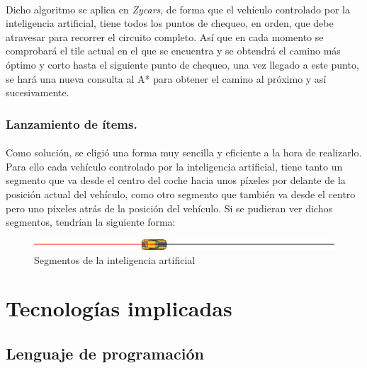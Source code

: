 \documentclass[a4paper,11pt]{article} %
\begin{document}
\paragraph{}
Dicho algoritmo se aplica en \emph{Zycars}, de forma que el vehículo controlado por la inteligencia artificial, tiene todos los
puntos de chequeo, en orden, que debe atravesar para recorrer el circuito completo. Así que en cada momento se comprobará
el tile actual en el que se encuentra y se obtendrá el camino más óptimo y corto hasta el siguiente punto de chequeo, una vez
llegado a este punto, se hará una nueva consulta al A* para obtener el camino al próximo y así sucesivamente.

\subsubsection{Lanzamiento de ítems.}

\paragraph{}
Como solución, se eligió una forma muy sencilla y eficiente a la hora de realizarlo. Para ello cada vehículo controlado por la
inteligencia artificial, tiene tanto un segmento que va desde el centro del
coche hacia unos píxeles por delante de la posición
actual del vehículo, como otro segmento que también va desde el centro pero uno
píxeles atrás de la posición del vehículo. 
Si se pudieran ver dichos segmentos, tendrían la siguiente forma:

\begin{figure}[H]
  \label{ia_segmentos}
  \begin{center}
    \includegraphics[scale=0.8]{imagenes/ia_segmentos.png}
  \end{center}
  \caption{Segmentos de la inteligencia artificial}
\end{figure}


\section{Tecnologías implicadas}

\subsection{Lenguaje de programación}
\end{document}
